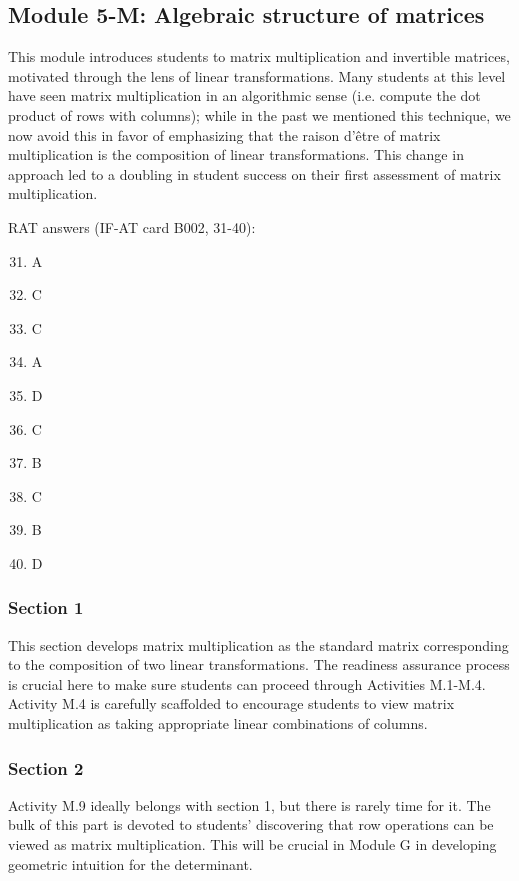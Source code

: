 \documentclass{article}
\begin{document}
\subsection*{Module 5-M: Algebraic structure of matrices}
This module introduces students to matrix multiplication and invertible matrices, motivated through the lens of linear transformations.  Many students at this level have seen matrix multiplication in an algorithmic sense (i.e. compute the dot product of rows with columns); while in the past we mentioned this technique, we now avoid this in favor of emphasizing that the raison d'\^{e}tre of matrix multiplication is the composition of linear transformations.  This change in approach led to a doubling in student success on their first assessment of matrix multiplication.


RAT answers (IF-AT card B002, 31-40):
\begin{multicols}{10}
\begin{enumerate}[1)]
\setcounter{enumi}{30}
\item A
\item C
\item C
\item A
\item D
\item C
\item B
\item C
\item B
\item D
\end{enumerate}
\end{multicols}


\subsubsection*{Section 1}
This section develops matrix multiplication as the standard matrix corresponding to the composition of two linear transformations.  The readiness assurance process is crucial here to make sure students can proceed through Activities M.1-M.4.  Activity M.4 is carefully  scaffolded to encourage students to view matrix multiplication as taking appropriate linear combinations of columns. 

\subsubsection*{Section 2}
Activity M.9 ideally belongs with section 1, but there is rarely time for it.  The bulk of this part is devoted to students' discovering that row operations can be viewed as matrix multiplication.  This will be crucial in Module G in developing geometric intuition for the determinant.  
\end{document}
